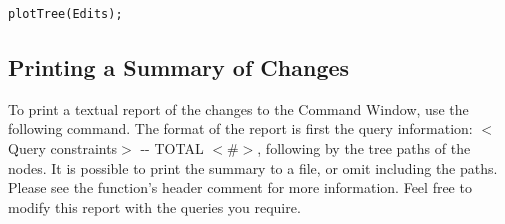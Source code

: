 \documentclass{article}
\begin{document}
\begin{lstlisting}
plotTree(Edits);
\end{lstlisting}

\subsection{Printing a Summary of Changes}
To print a textual report of the changes to the Command Window, use the following command. The format of the report is first the query information: $<$Query constraints$>$ -{}- TOTAL $<$\#$>$, following by the tree paths of the nodes. It is possible to print the summary to a  file, or omit including the paths. Please see the function's header comment for more information. Feel free to modify this report with the queries you require.

%
\end{document}
